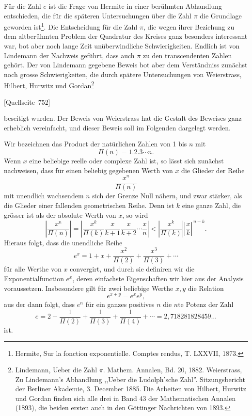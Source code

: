 \documentclass[11pt]{article}
\newcommand{\srcpage}[1]{\par\medskip\noindent\textsf{[Quellseite~#1]}\par\smallskip}
\begin{document}
Für die Zahl $e$ ist die Frage von Hermite in einer berühmten Abhandlung entschieden, die für die späteren Untersuchungen über die Zahl $\pi$ die Grundlage geworden ist\footnote{Hermite, Sur la fonction exponentielle. Comptes rendus, T. LXXVII, 1873.}. Die Entscheidung für die Zahl $\pi$, die wegen ihrer Beziehung zu dem altberühmten Problem der Quadratur des Kreises ganz besonders interessant war, bot aber noch lange Zeit unüberwindliche Schwierigkeiten. Endlich ist von Lindemann der Nachweis geführt, dass auch $\pi$ zu den transcendenten Zahlen gehört. Der von Lindemann gegebene Beweis bot aber dem Verständniss zunächst noch grosse Schwierigkeiten, die durch spätere Untersuchungen von Weierstrass, Hilbert, Hurwitz und Gordan\footnote{Lindemann, Ueber die Zahl $\pi$. Mathem. Annalen, Bd. 20, 1882. Weierstrass, Zu Lindemann's Abhandlung ,,Ueber die Ludolph'sche Zahl''. Sitzungsbericht der Berliner Akademie, 3. December 1885. Die Arbeiten von Hilbert, Hurwitz und Gordan finden sich alle drei in Band 43 der Mathematischen Annalen (1893), die beiden ersten auch in den Göttinger Nachrichten von 1893.}
\srcpage{752}
beseitigt wurden. Der Beweis von Weierstrass hat die Gestalt des Beweises ganz erheblich vereinfacht, und dieser Beweis soll im Folgenden dargelegt werden.

Wir bezeichnen das Product der natürlichen Zahlen von 1 bis $n$ mit
\[
\Pi(n)=1.2.3\cdots n.
\]
Wenn $x$ eine beliebige reelle oder complexe Zahl ist, so lässt sich zunächst nachweisen, dass für einen beliebig gegebenen Werth von $x$ die Glieder der Reihe
\begin{equation}\tag{1}
\frac{x^n}{\Pi(n)}
\end{equation}
mit unendlich wachsendem $n$ sich der Grenze Null nähern, und zwar stärker, als die Glieder einer fallenden geometrischen Reihe. Denn ist $k$ eine ganze Zahl, die grösser ist als der absolute Werth von $x$, so wird
\[
\left|\frac{x^n}{\Pi(n)}\right|
=
\left|\frac{x^k}{\Pi(k)}\frac{x}{k+1}\frac{x}{k+2}\cdots\frac{x}{n}\right|
<
\left|\frac{x^k}{\Pi(k)}\right|\left|\frac{x}{k}\right|^{\,n-k}.
\]
Hieraus folgt, dass die unendliche Reihe
\begin{equation}\tag{2}
e^x=1+x+\frac{x^2}{\Pi(2)}+\frac{x^3}{\Pi(3)}+\cdots
\end{equation}
für alle Werthe von $x$ convergirt, und durch sie definiren wir die Exponentialfunction $e^x$, deren einfachste Eigenschaften wir hier aus der Analysis voraussetzen. Insbesondere gilt für zwei beliebige Werthe $x,y$ die Relation
\[
e^{x+y}=e^x e^y,
\]
aus der dann folgt, dass $e^n$ für ein ganzes positives $n$ die $n$te Potenz der Zahl
\begin{equation}\tag{3}
e=2+\frac1{\Pi(2)}+\frac1{\Pi(3)}+\frac1{\Pi(4)}+\cdots
=2{,}718281828459\ldots
\end{equation}
ist.
\end{document}
